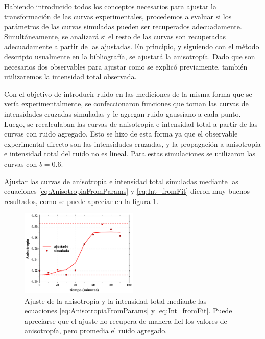 

Habiendo introducido todos los conceptos necesarios para ajustar la transformación de las curvas experimentales, procedemos a evaluar si los parámetros de las curvas simuladas pueden ser recuperados adecuadamente. Simultáneamente, se analizará si el resto de las curvas son recuperadas adecuadamente a partir de las ajustadas. En principio, y siguiendo con el método descripto usualmente en la bibliografía, se ajustará la anisotropía. Dado que son necesarios dos observables para ajustar como se explicó previamente, también utilizaremos la intensidad total observada.

Con el objetivo de introducir ruido en las mediciones de la misma forma que se vería experimentalmente, se confeccionaron funciones que toman las curvas de intensidades cruzadas simuladas y le agregan ruido gaussiano a cada punto. Luego, se recalculaban las curvas de anisotropía e intensidad total a partir de las curvas con ruido agregado. Esto se hizo de esta forma ya que el observable experimental directo son las intensidades cruzadas, y la propagación a anisotropía e intensidad total del ruido no es lineal. Para estas simulaciones se utilizaron las curvas con $b=0.6$.

Ajustar las curvas de anisotropía e intensidad total simuladas mediante las ecuaciones \ref{eq:AnisotropiaFromParams} y \ref{eq:Int_fromFit} dieron muy buenos resultados, como se puede apreciar en la figura \ref{fig:fit_AnNoisy}.

\begin{figure}
\centering
    \includegraphics[width=0.5\textwidth]{./img/An_Fit.png}
    \caption{Ajuste de la anisotropía y la intensidad total mediante las ecuaciones \ref{eq:AnisotropiaFromParams} y \ref{eq:Int_fromFit}. Puede apreciarse que el ajuste no recupera de manera fiel los valores de anisotropía, pero promedia el ruido agregado.}
    \label{fig:fit_AnNoisy}
\end{figure}

